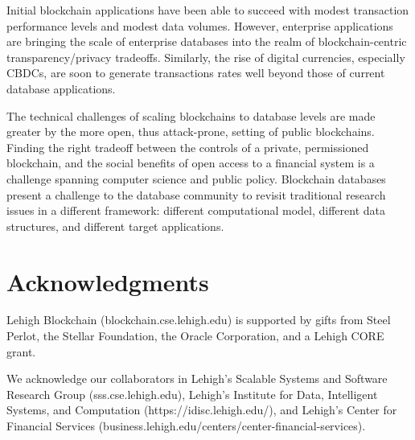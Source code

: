 \documentclass[11pt,dvipdfm]{article}
\begin{document}
Initial blockchain applications have been able to succeed with modest transaction performance levels and
modest data volumes. However, enterprise applications are bringing the scale of enterprise databases into 
the realm of blockchain-centric transparency/privacy tradeoffs.  Similarly, the rise of digital currencies,
especially CBDCs, are soon to generate transactions rates well beyond those of current database
applications.

The technical challenges of scaling blockchains to database levels are made greater by the more open,
thus attack-prone, setting of public blockchains.  Finding the right tradeoff between the controls of a private,
permissioned blockchain, and the social benefits of open access to a financial system is a challenge spanning
computer science and public policy.
Blockchain databases present a challenge to the database community to revisit traditional research issues
in a different framework: different computational model, different data structures, and different target applications.

\section*{Acknowledgments}
Lehigh Blockchain (blockchain.cse.lehigh.edu) is supported by gifts from Steel Perlot, the Stellar Foundation,
 the Oracle Corporation, and a Lehigh CORE grant.
 
 \noindent
We acknowledge our collaborators in Lehigh's Scalable Systems and Software Research Group (sss.cse.lehigh.edu),
Lehigh's Institute for Data, Intelligent Systems, and Computation (https://idisc.lehigh.edu/), 
and Lehigh's Center for Financial Services (business.lehigh.edu/centers/center-financial-services).
\end{document}
